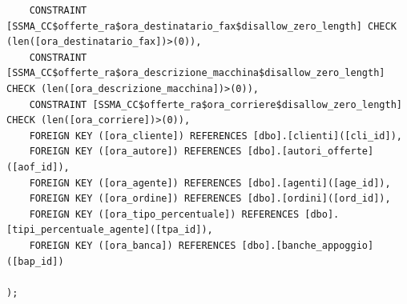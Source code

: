 \documentclass[12pt]{article}
\begin{document}
\begin{lstlisting}
    CONSTRAINT [SSMA_CC$offerte_ra$ora_destinatario_fax$disallow_zero_length] CHECK (len([ora_destinatario_fax])>(0)),
    CONSTRAINT [SSMA_CC$offerte_ra$ora_descrizione_macchina$disallow_zero_length] CHECK (len([ora_descrizione_macchina])>(0)),
    CONSTRAINT [SSMA_CC$offerte_ra$ora_corriere$disallow_zero_length] CHECK (len([ora_corriere])>(0)),
    FOREIGN KEY ([ora_cliente]) REFERENCES [dbo].[clienti]([cli_id]),
    FOREIGN KEY ([ora_autore]) REFERENCES [dbo].[autori_offerte]([aof_id]),
    FOREIGN KEY ([ora_agente]) REFERENCES [dbo].[agenti]([age_id]),
    FOREIGN KEY ([ora_ordine]) REFERENCES [dbo].[ordini]([ord_id]),
    FOREIGN KEY ([ora_tipo_percentuale]) REFERENCES [dbo].[tipi_percentuale_agente]([tpa_id]),
    FOREIGN KEY ([ora_banca]) REFERENCES [dbo].[banche_appoggio]([bap_id])
    
);


\end{lstlisting}
\end{document}
